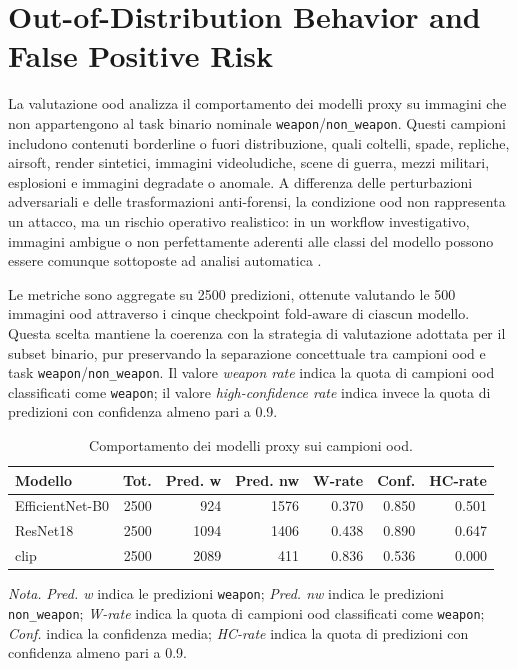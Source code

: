 \section{Out-of-Distribution Behavior and False Positive Risk}
\label{sec:results-ood}

La valutazione \gls{ood} analizza il comportamento dei modelli proxy su immagini
che non appartengono al task binario nominale \texttt{weapon}/\texttt{non\_weapon}.
Questi campioni includono contenuti borderline o fuori distribuzione, quali
coltelli, spade, repliche, airsoft, render sintetici, immagini videoludiche,
scene di guerra, mezzi militari, esplosioni e immagini degradate o anomale. A
differenza delle perturbazioni adversariali e delle trasformazioni anti-forensi,
la condizione \gls{ood} non rappresenta un attacco, ma un rischio operativo
realistico: in un workflow investigativo, immagini ambigue o non perfettamente
aderenti alle classi del modello possono essere comunque sottoposte ad analisi
automatica \cite{hendrycks2017baseline,liang2018odin,fort2021exploring}.

Le metriche sono aggregate su 2500 predizioni, ottenute valutando le 500 immagini
\gls{ood} attraverso i cinque checkpoint fold-aware di ciascun modello. Questa
scelta mantiene la coerenza con la strategia di valutazione adottata per il
subset binario, pur preservando la separazione concettuale tra campioni
\gls{ood} e task \texttt{weapon}/\texttt{non\_weapon}. Il valore \emph{weapon
rate} indica la quota di campioni \gls{ood} classificati come \texttt{weapon};
il valore \emph{high-confidence rate} indica invece la quota di predizioni con
confidenza almeno pari a 0.9.


\begin{table}[H]
\centering
\scriptsize
\setlength{\tabcolsep}{4pt}
\renewcommand{\arraystretch}{1.15}
\caption{Comportamento dei modelli proxy sui campioni \gls{ood}.}
\label{tab:results-ood-behavior}
\begin{tabular}{@{}l r r r r r r@{}}
\toprule
\textbf{Modello} &
\textbf{Tot.} &
\textbf{Pred. w} &
\textbf{Pred. nw} &
\textbf{W-rate} &
\textbf{Conf.} &
\textbf{HC-rate} \\
\midrule
EfficientNet-B0 & 2500 & 924  & 1576 & 0.370 & 0.850 & 0.501 \\
ResNet18        & 2500 & 1094 & 1406 & 0.438 & 0.890 & 0.647 \\
\acrshort{clip} & 2500 & 2089 & 411  & 0.836 & 0.536 & 0.000 \\
\bottomrule
\end{tabular}

\vspace{0.4em}
\footnotesize
\textit{Nota.} \textit{Pred. w} indica le predizioni \texttt{weapon};
\textit{Pred. nw} indica le predizioni \texttt{non\_weapon};
\textit{W-rate} indica la quota di campioni \gls{ood} classificati come
\texttt{weapon}; \textit{Conf.} indica la confidenza media; \textit{HC-rate}
indica la quota di predizioni con confidenza almeno pari a 0.9.
\end{table}



